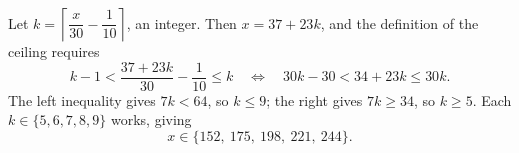 Let $k=\left\lceil\dfrac{x}{30}-\dfrac{1}{10}\right\rceil$, an integer. Then $x=37+23k$, and the definition of the ceiling requires
\[k-1<\dfrac{37+23k}{30}-\dfrac{1}{10}\le k\quad\Longleftrightarrow\quad 30k-30<34+23k\le 30k.\]
The left inequality gives $7k<64$, so $k\le 9$; the right gives $7k\ge34$, so $k\ge5$. Each $k\in\{5,6,7,8,9\}$ works, giving
\[x\in\{152,\ 175,\ 198,\ 221,\ 244\}.\]

